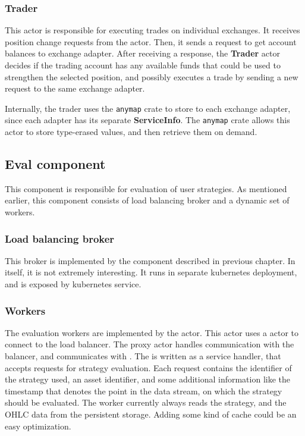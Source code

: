 \subsubsection{Trader}
This actor is responsible for executing trades on individual exchanges. It receives position change requests from the 
actor. Then, it sends a request to get account balances to exchange adapter. After receiving a response, the
\textbf{Trader} actor decides if the trading account has any available funds that could be used to strengthen
the selected position, and possibly executes a trade by sending a new request to the same exchange adapter.

Internally, the trader uses the \verb|anymap| crate to store  to each exchange
adapter, since each adapter has its separate \textbf{ServiceInfo}. The \verb|anymap| crate allows
this actor to store type-erased values, and then retrieve them on demand.

\subsection{Eval component}
This component is responsible for evaluation of user strategies. As mentioned earlier, this component consists
of load balancing broker and a dynamic set of workers.

\subsubsection{Load balancing broker}
This broker is implemented by the  component described in previous chapter. In itself,
it is not extremely interesting. It runs in separate kubernetes deployment, and is exposed by kubernetes service.

\subsubsection{Workers}
The evaluation workers are implemented by the  actor. This actor uses a 
actor to connect to the load balancer. The proxy actor handles communication with the balancer, and
communicates with . The  is written as a service handler, that accepts requests
for strategy evaluation. Each request contains the identifier of the strategy used, an asset identifier,
and some additional information like the timestamp that denotes the point in the data stream, on which
the strategy should be evaluated. The worker currently always reads the strategy, and the OHLC data from the
persistent storage. Adding some kind of cache could be an easy optimization.

